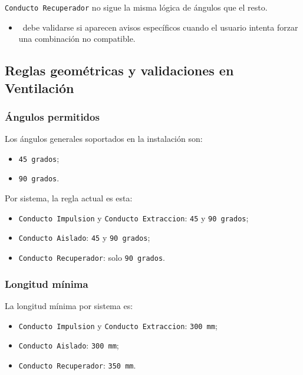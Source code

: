 \texttt{Conducto Recuperador} no sigue la misma lógica de ángulos que el resto.

\begin{itemize}
\item \pendingtag\ debe validarse si aparecen avisos específicos cuando el usuario intenta forzar una combinación no compatible.
\end{itemize}

\subsection{Reglas geométricas y validaciones en Ventilación}

\subsubsection{Ángulos permitidos}

Los ángulos generales soportados en la instalación son:

\begin{itemize}
\item \texttt{45 grados};
\item \texttt{90 grados}.
\end{itemize}

Por sistema, la regla actual es esta:

\begin{itemize}
\item \texttt{Conducto Impulsion} y \texttt{Conducto Extraccion}: \texttt{45} y \texttt{90 grados};
\item \texttt{Conducto Aislado}: \texttt{45} y \texttt{90 grados};
\item \texttt{Conducto Recuperador}: solo \texttt{90 grados}.
\end{itemize}

\subsubsection{Longitud mínima}

La longitud mínima por sistema es:

\begin{itemize}
\item \texttt{Conducto Impulsion} y \texttt{Conducto Extraccion}: \texttt{300 mm};
\item \texttt{Conducto Aislado}: \texttt{300 mm};
\item \texttt{Conducto Recuperador}: \texttt{350 mm}.
\end{itemize}

